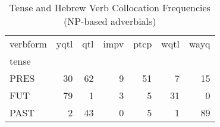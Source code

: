 \begin{table}[htbp!]
\centering
\caption{Tense and Hebrew Verb Collocation Frequencies (NP-based adverbials)}
\label{table:np_tense_ct}
\begin{tabular}{lrrrrrr}
\toprule
verbform &  yqtl &  qtl &  impv &  ptcp &  wqtl &  wayq \\
tense &       &      &       &       &       &       \\
\midrule
PRES  &    30 &   62 &     9 &    51 &     7 &    15 \\
FUT   &    79 &    1 &     3 &     5 &    31 &     0 \\
PAST  &     2 &   43 &     0 &     5 &     1 &    89 \\
\bottomrule
\end{tabular}
\end{table}

